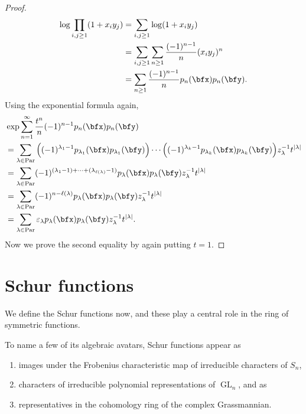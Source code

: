 \documentclass{article}
\DeclareMathOperator{\Par}{Par}
\begin{document}
\begin{proof}
    \begin{align*}
        \log \prod_{i,j \geq 1}
        (1+x_iy_j)
        &=
        \sum_{i,j\geq1}
        \log(1+x_iy_j) \\
        &=
        \sum_{i,j \geq 1}
        \sum_{n\geq 1}
        \frac{(-1)^{n-1}}{n}(x_iy_j)^n \\
        &=
        \sum_{n \geq 1}
        \frac{(-1)^{n-1}}{n} p_n(\bfx) p_n(\bfy).
    \end{align*}
    Using the exponential formula again,
    \begin{align*}
        &\exp
        \sum_{n=1}^\infty
        \frac{t^n}{n}
        (-1)^{n-1}
        p_n(\bfx) p_n(\bfy)
        \\
        &=
        \sum_{\lambda \in \Par}
        \Big(
            (-1)^{\lambda_1-1}
            p_{\lambda_1}(\bfx) p_{\lambda_1}(\bfy)
        \Big)
        \cdots
        \Big(
            (-1)^{\lambda_k-1}
            p_{\lambda_k}(\bfx) p_{\lambda_k}(\bfy)
        \Big)
        z_\lambda^{-1}
        t^{|\lambda|} \\
        &=
        \sum_{\lambda \in \Par}
        (-1)^{(\lambda_1 - 1) + \cdots + (\lambda_{\ell(\lambda)} - 1)}
        p_\lambda(\bfx) p_\lambda(\bfy) z_\lambda^{-1}
        t^{|\lambda|} \\
        &=
        \sum_{\lambda \in \Par}
        (-1)^{n - \ell(\lambda)}
        p_\lambda(\bfx) p_\lambda(\bfy) z_\lambda^{-1}
        t^{|\lambda|} \\
        &=
        \sum_{\lambda \in \Par}
        \varepsilon_\lambda
        p_\lambda(\bfx) p_\lambda(\bfy) z_\lambda^{-1}
        t^{|\lambda|}.
    \end{align*}
    Now we prove the second equality by again putting $t=1$.
\end{proof}

\section{Schur functions}
\label{ch:schurs}

We define the Schur functions now, and these play a central role in the ring of symmetric functions.

To name a few of its algebraic avatars, Schur functions appear as
\begin{enumerate}[label=(\alph*)]
    \item 
        images under the Frobenius characteristic map of irreducible characters of $S_n$,
    \item 
        characters of irreducible polynomial representations of $\operatorname{GL}_n$, and as
    \item 
        representatives in the cohomology ring of the complex Grassmannian.
\end{enumerate}
\end{document}

